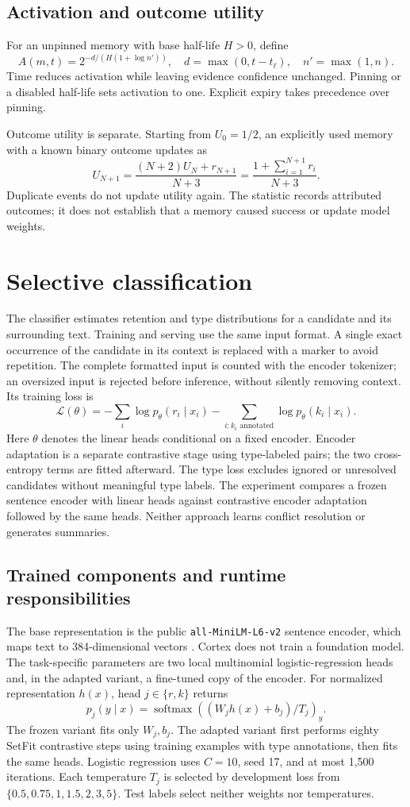 \documentclass[11pt]{article}
\begin{document}
\subsection{Activation and outcome utility}
For an unpinned memory with base half-life $H>0$, define
\[
 A(m,t)=2^{-d/(H(1+\log n'))},\quad
 d=\max(0,t-t_\ell),\quad n'=\max(1,n).
\]
Time reduces activation while leaving evidence confidence unchanged. Pinning or a disabled half-life sets activation to one. Explicit expiry takes precedence over pinning.

Outcome utility is separate. Starting from $U_0=1/2$, an explicitly used memory with a known binary outcome updates as
\[
 U_{N+1}=\frac{(N+2)U_N+r_{N+1}}{N+3}
        =\frac{1+\sum_{i=1}^{N+1}r_i}{N+3}.
\]
Duplicate events do not update utility again. The statistic records attributed outcomes; it does not establish that a memory caused success or update model weights.

\section{Selective classification}
The classifier estimates retention and type distributions for a candidate and its surrounding text. Training and serving use the same input format. A single exact occurrence of the candidate in its context is replaced with a marker to avoid repetition. The complete formatted input is counted with the encoder tokenizer; an oversized input is rejected before inference, without silently removing context. Its training loss is
\[
 \mathcal{L}(\theta)=
 -\sum_i\log p_\theta(r_i\mid x_i)
 -\sum_{i:k_i\text{ annotated}}\log p_\theta(k_i\mid x_i).
\]
Here $\theta$ denotes the linear heads conditional on a fixed encoder. Encoder adaptation is a separate contrastive stage using type-labeled pairs; the two cross-entropy terms are fitted afterward. The type loss excludes ignored or unresolved candidates without meaningful type labels. The experiment compares a frozen sentence encoder with linear heads against contrastive encoder adaptation followed by the same heads. Neither approach learns conflict resolution or generates summaries.

\subsection{Trained components and runtime responsibilities}
The base representation is the public \texttt{all-MiniLM-L6-v2} sentence encoder, which maps text to 384-dimensional vectors \citep{minilmcard}. Cortex does not train a foundation model. The task-specific parameters are two local multinomial logistic-regression heads and, in the adapted variant, a fine-tuned copy of the encoder. For normalized representation $h(x)$, head $j\in\{r,k\}$ returns
\[
 p_j(y\mid x)=\operatorname{softmax}\!\left((W_jh(x)+b_j)/T_j\right)_y.
\]
The frozen variant fits only $W_j,b_j$. The adapted variant first performs eighty SetFit contrastive steps using training examples with type annotations, then fits the same heads. Logistic regression uses $C=10$, seed 17, and at most 1,500 iterations. Each temperature $T_j$ is selected by development loss from $\{0.5,0.75,1,1.5,2,3,5\}$. Test labels select neither weights nor temperatures.
\end{document}
